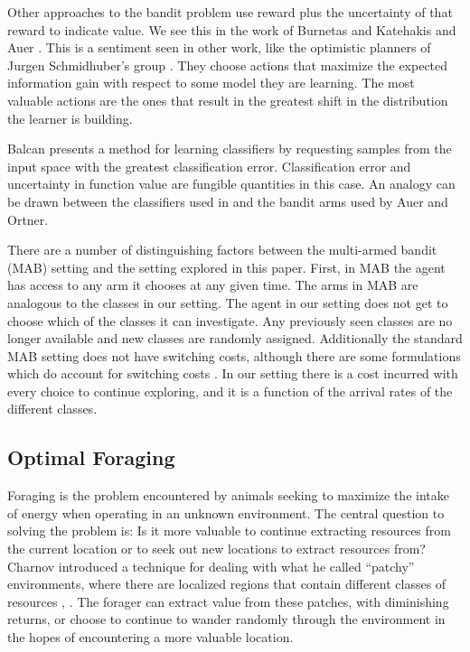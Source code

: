 Other approaches to the bandit problem use reward plus the uncertainty of that
reward to indicate value.  We see this in the work of Burnetas and Katehakis
\cite{burnetas1997optimal} and Auer \cite{auer2003using}.  This is a sentiment
seen in other work, like the optimistic planners of Jurgen Schmidhuber's group
\cite{schmidhuber1997what,schmidhuber2003exploring,schmidhuber2009simple,sun2011planning}.
They choose actions that maximize the expected information gain with respect to
some model they are learning.  The most valuable actions are the ones that
result in the greatest shift in the distribution the learner is building.

Balcan \cite{balcan2006agnostic} presents a method for learning classifiers by
requesting samples from the input space with the greatest classification
error.  Classification error and uncertainty in function value
are fungible quantities in this case.  An analogy can be drawn between
the classifiers used in \cite{balcan2006agnostic} and the bandit arms used by
Auer and Ortner\cite{auer2010ucb}.


There are a number of distinguishing factors between the multi-armed bandit
(MAB) setting and the setting explored in this paper.  First, in MAB the agent
has access to any arm it chooses at any given time.  The arms in MAB are
analogous to the classes in our setting.  The agent in our setting does not get
to choose which of the classes it can investigate.  Any previously seen classes
are no longer available and new classes are randomly assigned.  Additionally
the standard MAB setting does not have switching costs, although there are some
formulations which do account for switching costs
\cite{switchingBanditPapersFindOne}.  In our setting there is a cost incurred
with every choice to continue exploring, and it is a function of the arrival
rates of the different classes.

\subsection{Optimal Foraging}

Foraging is the problem encountered by animals seeking to maximize the intake
of energy when operating in an unknown environment.  The central question to
solving the problem is: Is it more valuable to continue extracting resources
from the current location or to seek out new locations to extract resources
from?  Charnov introduced a technique for dealing with what he called
``patchy'' environments, where there are localized regions that contain
different classes of resources \cite{charnov1973optimal},
\cite{charnov1976optimal}.  The forager can extract value from these patches,
with diminishing returns, or choose to continue to wander randomly through the
environment in the hopes of encountering a more valuable location.


